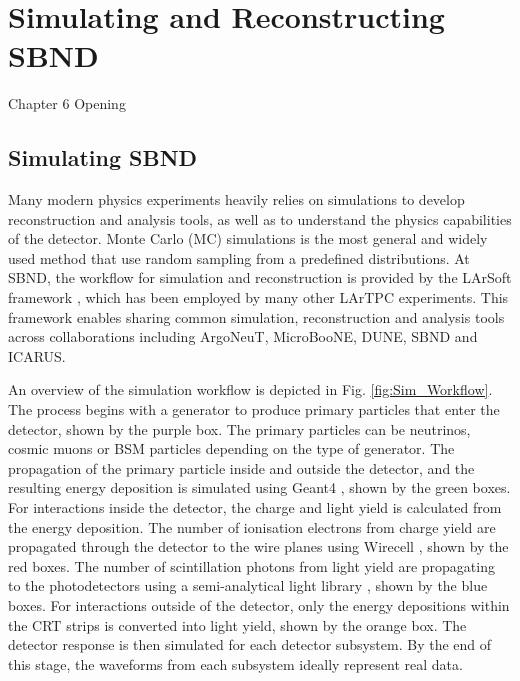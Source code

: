 
\chapter{Simulating and Reconstructing SBND}
\label{Chapter6}

\ifpdf
    \graphicspath{{Chapter6/Figs/Raster/}{Chapter6/Figs/PDF/}{Chapter6/Figs/}}
\else
    \graphicspath{{Chapter6/Figs/Vector/}{Chapter6/Figs/}}
\fi


Chapter 6 Opening

\newpage

\section{Simulating SBND}

Many modern physics experiments heavily relies on simulations to develop reconstruction and analysis tools, as well as to understand the physics capabilities of the detector.
Monte Carlo (MC) simulations is the most general and widely used method that use random sampling from a predefined distributions. 
At SBND, the workflow for simulation and reconstruction is provided by the LArSoft framework \cite{}, which has been employed by many other LArTPC experiments.
This framework enables sharing common simulation, reconstruction and analysis tools across collaborations including ArgoNeuT, MicroBooNE, DUNE, SBND and ICARUS.

An overview of the simulation workflow is depicted in Fig. \ref{fig:Sim_Workflow}.
The process begins with a generator to produce primary particles that enter the detector, shown by the purple box.
The primary particles can be neutrinos, cosmic muons or BSM particles depending on the type of generator.
The propagation of the primary particle inside and outside the detector, and the resulting energy deposition is simulated using Geant4 \cite{geant4}, shown by the green boxes.
For interactions inside the detector, the charge and light yield is calculated from the energy deposition.
The number of ionisation electrons from charge yield are propagated through the detector to the wire planes using Wirecell \cite{wirecell}, shown by the red boxes.
The number of scintillation photons from light yield are propagating to the photodetectors using a semi-analytical light library \cite{}, shown by the blue boxes.
For interactions outside of the detector, only the energy depositions within the CRT strips is converted into light yield, shown by the orange box.
The detector response is then simulated for each detector subsystem.
By the end of this stage, the waveforms from each subsystem ideally represent real data.

